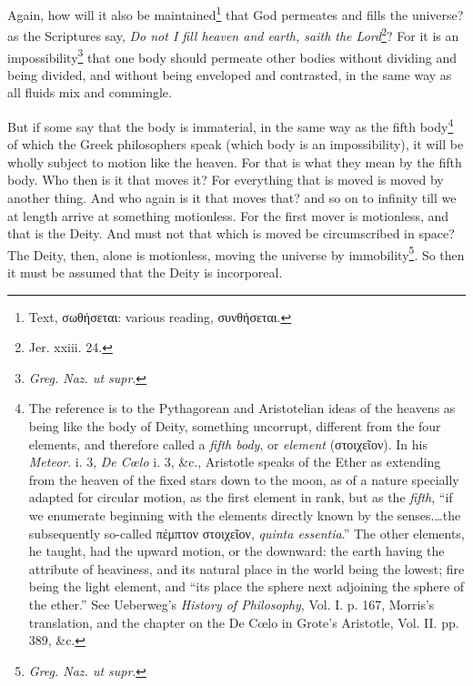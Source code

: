 Again, how will it also be maintained\footnote{Text, \textgreek{σωθήσεται}: various reading, \textgreek{συνθήσεται}.} that God permeates and fills the universe? as the Scriptures say, \emph{Do not I fill heaven and earth, saith the Lord}\footnote{Jer. xxiii. 24.}? For it is an impossibility\footnote{\emph{Greg. Naz. ut supr}.} that one body should permeate other bodies without dividing and being divided, and without being enveloped and contrasted, in the same way as all fluids mix and commingle.

But if some say that the body is immaterial, in the same way as the fifth body\footnote{The reference is to the Pythagorean and Aristotelian ideas of the heavens as being like the body of Deity, something uncorrupt, different from the four elements, and therefore called a \emph{fifth body}, or \emph{element }(\textgreek{στοιχεῖον}). In his \emph{Meteor}. i. 3, \emph{De Cœlo }i. 3, \&c., Aristotle speaks of the Ether as extending from the heaven of the fixed stars down to the moon, as of a nature specially adapted for circular motion, as the first element in rank, but as the \emph{fifth}, “if we enumerate beginning with the elements directly known by the senses.…the subsequently so-called \textgreek{πέμπτον στοιχεῖον}, \emph{quinta essentia}.” The other elements, he taught, had the upward motion, or the downward: the earth having the attribute of heaviness, and its natural place in the world being the lowest; fire being the light element, and “its place the sphere next adjoining the sphere of the ether.” See Ueberweg’s \emph{History of Philosophy}, Vol. I. p. 167, Morris’s translation, and the chapter on the De Cœlo in Grote’s Aristotle, Vol. II. pp. 389, \&c.} of which the Greek philosophers speak (which body is an impossibility), it will be wholly subject to motion like the heaven. For that is what they mean by the fifth body. Who then is it that moves it? For everything that is moved is moved by another thing. And who again is it that moves that? and so on to infinity till we at length arrive at something motionless. For the first mover is motionless, and that is the Deity. And must not that which is moved be circumscribed in space? The Deity, then, alone is motionless, moving the universe by immobility\footnote{\emph{Greg. Naz. ut supr}.}. So then it must be assumed that the Deity is incorporeal.

